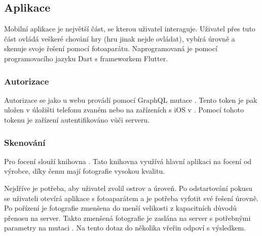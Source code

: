 \subsection{Aplikace}
Mobilní aplikace je největší část, se kterou uživatel interaguje. Uživatel přes tuto část ovládá veškeré chování hry (hru jinak nejde ovládat), vybírá úrovně a skenuje svoje řešení pomocí fotoaparátu. Naprogramovaná je pomocí programovacího jazyku Dart s frameworkem Flutter. 

\subsubsection{Autorizace}
Autorizace se jako u webu provádí pomocí GraphQL mutace . Tento token je pak uložen v úložišti telefonu zvaném \cite{SharedPreferences} nebo na zařízeních s iOS v \cite{NSUserDefaults}. Pomocí tohoto tokenu je zařízení autentifikováno vůči serveru.

\subsubsection{Skenování}
Pro focení slouží knihovna \cite{ImagePicker}. Tato knihovna využívá hlavní aplikaci na focení od výrobce, díky čemu mají fotografie vysokou kvalitu.\par
Nejdříve je potřeba, aby uživatel zvolil ostrov a úroveň. Po odstartování pokusu se uživateli otevírá aplikace s fotoaparátem a je potřeba vyfotit své řešení úrovně. Po pořízení je fotografie zmenšena do menší velikosti z kapacitních důvodů přenosu na server. Takto zmenšená fotografie je zaslána na server s potřebnými parametry na mutaci . Na tento dotaz do několika vřeřin odpoví s výsledkem.
